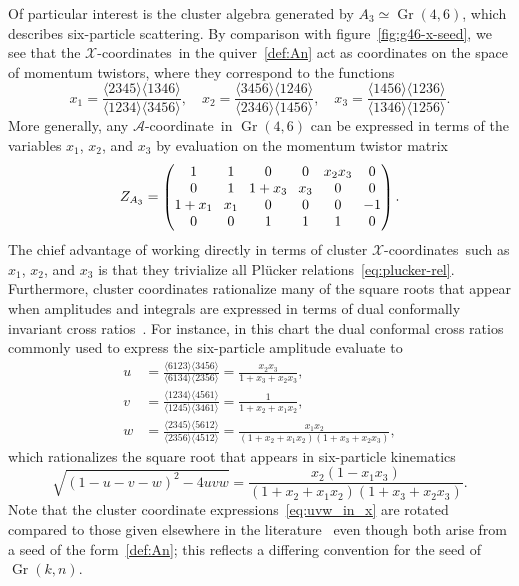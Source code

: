 \documentclass[11pt]{article}
\DeclareMathOperator{\Gr}{Gr}
\def\ket#1{\langle #1 \rangle}
\def\xcoords{$\mathcal{X}$-coordinates}
\def\acoord{$\mathcal{A}$-coordinate}
\begin{document}
Of particular interest is the cluster algebra generated by $A_3 \simeq \Gr(4,6)$, which describes six-particle scattering. By comparison with figure~\ref{fig:g46-x-seed}, we see that the \xcoords\ in the quiver~\eqref{def:An} act as coordinates on the space of momentum twistors, where they correspond to the functions
\begin{equation}
x_1 = \frac{\ket{2345}\ket{1346}}{\ket{1234}\ket{3456}}, \quad x_2 = \frac{\ket{3456}\ket{1246}}{\ket{2346}\ket{1456}}, \quad x_3 = \frac{\ket{1456}\ket{1236}}{\ket{1346}\ket{1256}}.
\end{equation}
More generally, any \acoord\ in $\Gr(4,6)$ can be expressed in terms of the variables $x_1$, $x_2$, and $x_3$ by evaluation on the momentum twistor matrix
\begin{equation} \label{eq:a3_momentum_twistor_matrix}
Z_{A_3} = 
\begingroup
\setlength\arraycolsep{4pt}
\begin{pmatrix} 
1 & 1 & 0 & 0 & x_2 x_3 & 0 \\
0 & 1 & 1+x_3 & x_3 & 0 & 0 \\
1+x_1 & x_1 & 0 & 0 & 0 & -1 \\
0 & 0 & 1 & 1 & 1 & 0
\end{pmatrix}.
\endgroup 
\end{equation}
The chief advantage of working directly in terms of cluster \xcoords\ such as $x_1$, $x_2$, and $x_3$ is that they trivialize all Pl\"ucker relations~\eqref{eq:plucker-rel}. Furthermore, cluster coordinates rationalize many of the square roots that appear when amplitudes and integrals are expressed in terms of dual conformally invariant cross ratios~\cite{Bourjaily:2018aeq}. For instance, in this chart the dual conformal cross ratios commonly used to express the six-particle amplitude evaluate to
\begin{align} \label{eq:uvw_in_x}
u &= \frac{\ket{6123}\ket{3456}}{\ket{6134}\ket{2356}} = \frac{x_2 x_3}{1+x_3+x_2 x_3}, \\ 
v &= \frac{\ket{1234} \ket{4561}}{\ket{1245}\ket{3461}} =\frac{1}{1+x_2+x_1 x_2}, \\ 
w &= \frac{\ket{2345} \ket{5612}}{\ket{2356}\ket{4512}} =\frac{x_1 x_2}{(1+x_2+x_1 x_2)(1+x_3+x_2 x_3)},
\end{align}
which rationalizes the square root that appears in six-particle kinematics 
\begin{equation}
\sqrt{(1 - u - v - w)^2 - 4 u v w} = \frac{x_2 (1 - x_1 x_3)}{(1 + x_2 + x_1 x_2)(1 + x_3 + x_2 x_3)} .
\end{equation}
Note that the cluster coordinate expressions~\eqref{eq:uvw_in_x} are rotated compared to those given elsewhere in the literature~\cite{Golden:2013xva,Parker:2015cia} even though both arise from a seed of the form~\eqref{def:An}; this reflects a differing convention for the seed of $\Gr(k,n)$.
\end{document}
